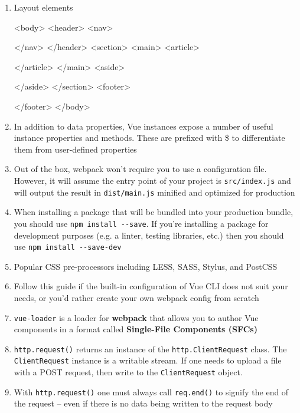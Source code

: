 \documentclass[a4paper,12pt]{article}
\begin{document}
\begin{enumerate}
\item Layout elements
\begin{htmlcode}
<body>
  <header>
    <nav>

    </nav>
  </header>
  <section>
    <main>
      <article>

      </article>
    </main>
    <aside>

    </aside>
  </section>
  <footer>

  </footer>
</body>
\end{htmlcode}

\item In addition to data properties, Vue instances expose a number of useful instance properties and methods. These are prefixed with \$ to differentiate them from user-defined properties

\item Out of the box, webpack won't require you to use a configuration file. However, it will assume the entry point of your project is \verb|src/index.js| and will output the result in \verb|dist/main.js| minified and optimized for production

\item When installing a package that will be bundled into your production bundle, you should use \verb|npm install --save|. If you're installing a package for development purposes (e.g. a linter, testing libraries, etc.) then you should use \verb|npm install --save-dev|

\item Popular CSS pre-processors including LESS, SASS, Stylus, and PostCSS

\item Follow this guide if the built-in configuration of Vue CLI does not suit your needs, or you'd rather create your own webpack config from scratch
	
\item \verb|vue-loader| is a loader for \textbf{webpack} that allows you to author Vue components in a format called\textbf{ Single-File Components (SFCs)}
	
\item \verb|http.request()| returns an instance of the \verb|http.ClientRequest| class. The\\ \verb|ClientRequest| instance is a writable stream. If one needs to upload a file with a POST request, then write to the \verb|ClientRequest| object.	
	
\item  With \verb|http.request()| one must always call \verb|req.end()| to signify the end of the request -- even if there is no data being written to the request body	
	


\end{enumerate}
\end{document}

